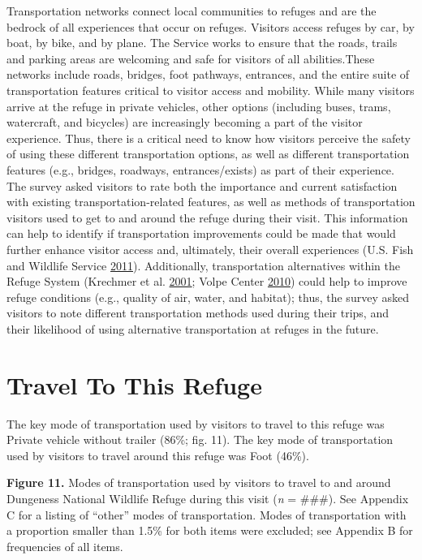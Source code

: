 \documentclass[]{book}
\let\BeginKnitrBlock\begin \let\EndKnitrBlock\end
\begin{document}
\BeginKnitrBlock{preamble1}
Transportation networks connect local communities to refuges and are the
bedrock of all experiences that occur on refuges. Visitors access
refuges by car, by boat, by bike, and by plane. The Service works to
ensure that the roads, trails and parking areas are welcoming and safe
for visitors of all abilities.These networks include roads, bridges,
foot pathways, entrances, and the entire suite of transportation
features critical to visitor access and mobility. While many visitors
arrive at the refuge in private vehicles, other options (including
buses, trams, watercraft, and bicycles) are increasingly becoming a part
of the visitor experience. Thus, there is a critical need to know how
visitors perceive the safety of using these different transportation
options, as well as different transportation features (e.g., bridges,
roadways, entrances/exists) as part of their experience. The survey
asked visitors to rate both the importance and current satisfaction with
existing transportation-related features, as well as methods of
transportation visitors used to get to and around the refuge during
their visit. This information can help to identify if transportation
improvements could be made that would further enhance visitor access
and, ultimately, their overall experiences (U.S. Fish and Wildlife
Service \protect\hyperlink{ref-USFWS2011}{2011}). Additionally,
transportation alternatives within the Refuge System (Krechmer et al.
\protect\hyperlink{ref-krechmer2001}{2001}; Volpe Center
\protect\hyperlink{ref-volpe2010}{2010}) could help to improve refuge
conditions (e.g., quality of air, water, and habitat); thus, the survey
asked visitors to note different transportation methods used during
their trips, and their likelihood of using alternative transportation at
refuges in the future.
\EndKnitrBlock{preamble1}

\section{Travel To This Refuge}\label{travel-to-this-refuge}

The key mode of transportation used by visitors to travel to this refuge
was Private vehicle without trailer (86\%; fig. 11). The key mode of
transportation used by visitors to travel around this refuge was Foot
(46\%).

\textbf{Figure 11.} Modes of transportation used by visitors to travel
to and around Dungeness National Wildlife Refuge during this visit
(\emph{n} = \#\#\#). See Appendix C for a listing of ``other'' modes of
transportation. Modes of transportation with a proportion smaller than
1.5\% for both items were excluded; see Appendix B for frequencies of
all items.
\end{document}
